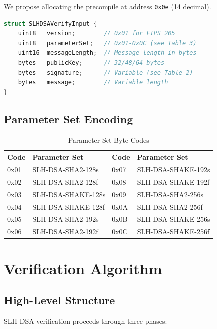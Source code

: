 \documentclass[11pt,a4paper]{article}
\begin{document}
We propose allocating the precompile at address \texttt{0x0e} (14 decimal).

\begin{lstlisting}[language=C]
struct SLHDSAVerifyInput {
    uint8   version;        // 0x01 for FIPS 205
    uint8   parameterSet;   // 0x01-0x0C (see Table 3)
    uint16  messageLength;  // Message length in bytes
    bytes   publicKey;      // 32/48/64 bytes
    bytes   signature;      // Variable (see Table 2)
    bytes   message;        // Variable length
}
\end{lstlisting}

\subsection{Parameter Set Encoding}

\begin{table}[htbp]
\centering
\caption{Parameter Set Byte Codes}
\label{tab:codes}
\begin{tabular}{@{}llll@{}}
\toprule
Code & Parameter Set & Code & Parameter Set \\
\midrule
0x01 & SLH-DSA-SHA2-128s & 0x07 & SLH-DSA-SHAKE-192s \\
0x02 & SLH-DSA-SHA2-128f & 0x08 & SLH-DSA-SHAKE-192f \\
0x03 & SLH-DSA-SHAKE-128s & 0x09 & SLH-DSA-SHA2-256s \\
0x04 & SLH-DSA-SHAKE-128f & 0x0A & SLH-DSA-SHA2-256f \\
0x05 & SLH-DSA-SHA2-192s & 0x0B & SLH-DSA-SHAKE-256s \\
0x06 & SLH-DSA-SHA2-192f & 0x0C & SLH-DSA-SHAKE-256f \\
\bottomrule
\end{tabular}
\end{table}

\section{Verification Algorithm}

\subsection{High-Level Structure}

SLH-DSA verification proceeds through three phases:
\end{document}

